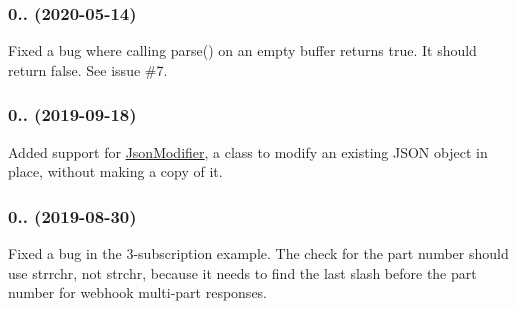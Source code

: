 \subsubsection*{0.. (2020-\/05-\/14)}

Fixed a bug where calling parse() on an empty buffer returns true. It should return false. See issue \#7.

\subsubsection*{0.. (2019-\/09-\/18)}

Added support for \hyperlink{class_json_modifier}{Json\+Modifier}, a class to modify an existing J\+S\+ON object in place, without making a copy of it.

\subsubsection*{0.. (2019-\/08-\/30)}

Fixed a bug in the 3-\/subscription example. The check for the part number should use strrchr, not strchr, because it needs to find the last slash before the part number for webhook multi-\/part responses. 